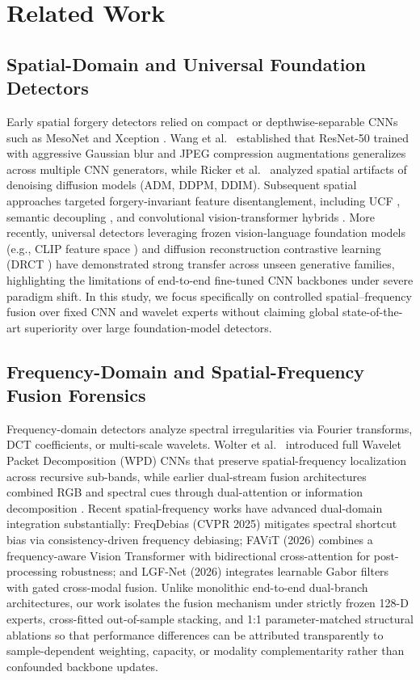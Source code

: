 \documentclass[fleqn,10pt]{wlscirep}
\begin{document}
\section*{Related Work}

\subsection*{Spatial-Domain and Universal Foundation Detectors}
Early spatial forgery detectors relied on compact or depthwise-separable CNNs such as MesoNet \cite{ref24} and Xception \cite{ref28}. Wang et al.\ \cite{ref4} established that ResNet-50 trained with aggressive Gaussian blur and JPEG compression augmentations generalizes across multiple CNN generators, while Ricker et al.\ \cite{ref5} analyzed spatial artifacts of denoising diffusion models (ADM, DDPM, DDIM). Subsequent spatial approaches targeted forgery-invariant feature disentanglement, including UCF \cite{ref31}, semantic decoupling \cite{ref29}, and convolutional vision-transformer hybrids \cite{ref30}. More recently, universal detectors leveraging frozen vision-language foundation models (e.g., CLIP feature space \cite{ref41}) and diffusion reconstruction contrastive learning (DRCT \cite{ref42}) have demonstrated strong transfer across unseen generative families, highlighting the limitations of end-to-end fine-tuned CNN backbones under severe paradigm shift. In this study, we focus specifically on controlled spatial--frequency fusion over fixed CNN and wavelet experts without claiming global state-of-the-art superiority over large foundation-model detectors.

\subsection*{Frequency-Domain and Spatial-Frequency Fusion Forensics}
Frequency-domain detectors analyze spectral irregularities via Fourier transforms, DCT coefficients, or multi-scale wavelets. Wolter et al.\ \cite{ref8} introduced full Wavelet Packet Decomposition (WPD) CNNs that preserve spatial-frequency localization across recursive sub-bands, while earlier dual-stream fusion architectures combined RGB and spectral cues through dual-attention or information decomposition \cite{ref6,ref7}. Recent spatial-frequency works have advanced dual-domain integration substantially: FreqDebias (CVPR 2025) \cite{ref45} mitigates spectral shortcut bias via consistency-driven frequency debiasing; FAViT (2026) \cite{ref43} combines a frequency-aware Vision Transformer with bidirectional cross-attention for post-processing robustness; and LGF-Net (2026) \cite{ref44} integrates learnable Gabor filters with gated cross-modal fusion. Unlike monolithic end-to-end dual-branch architectures, our work isolates the fusion mechanism under strictly frozen 128-D experts, cross-fitted out-of-sample stacking, and 1:1 parameter-matched structural ablations so that performance differences can be attributed transparently to sample-dependent weighting, capacity, or modality complementarity rather than confounded backbone updates.
\end{document}
